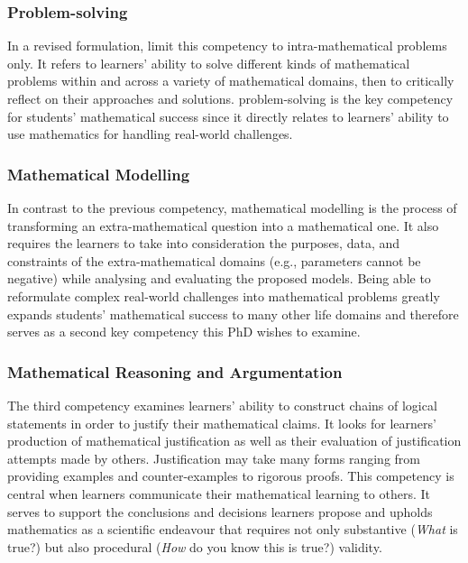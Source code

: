 \documentclass[
    a4paper,                %
    11pt,                   %
    stu,                    %
    donotrepeattitle,       %
    floatsintext,           %
    biblatex,               %
    colorlinks=true,        %
    linkcolor=red,          %
    anchorcolor=black,      %
    citecolor=blue,         %
    urlcolor=blue,          %
    bookmarks=true,         %
    bookmarksopen=false,    %
    bookmarksnumbered=true, %
    dvipsnames              %
]{apa7}
\begin{document}
\subsubsection{Problem-solving}

In a revised formulation, \textcite{niss:2019} limit this competency to intra-mathematical problems only. It refers to learners' ability to solve different kinds of mathematical problems within and across a variety of mathematical domains, then to critically reflect on their approaches and solutions. problem-solving is the key competency for students' mathematical success since it directly relates to learners' ability to use mathematics for handling real-world challenges.

\subsubsection{Mathematical Modelling}

In contrast to the previous competency, mathematical modelling is the process of transforming an extra-mathematical question into a mathematical one. It also requires the learners to take into consideration the purposes, data, and constraints of the extra-mathematical domains (e.g., parameters cannot be negative) while analysing and evaluating the proposed models. Being able to reformulate complex real-world challenges into mathematical problems greatly expands students' mathematical success to many other life domains and therefore serves as a second key competency this PhD wishes to examine.

\subsubsection{Mathematical Reasoning and Argumentation}

The third competency examines learners' ability to construct chains of logical statements in order to justify their mathematical claims. It looks for learners' production of mathematical justification as well as their evaluation of justification attempts made by others. Justification may take many forms ranging from providing examples and counter-examples to rigorous proofs. This competency is central when learners communicate their mathematical learning to others. It serves to support the conclusions and decisions learners propose and upholds mathematics as a scientific endeavour that requires not only substantive (\emph{What} is true?) but also procedural (\emph{How} do you know this is true?) validity.
\end{document}

